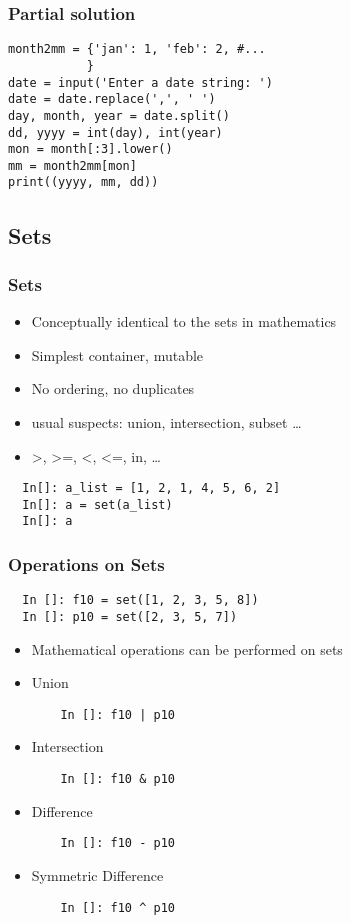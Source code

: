 \documentclass[14pt,compress]{beamer}
\begin{document}
\begin{frame}[fragile]
  \frametitle{Partial solution}
\begin{lstlisting}
month2mm = {'jan': 1, 'feb': 2, #...
           }
date = input('Enter a date string: ')
date = date.replace(',', ' ')
day, month, year = date.split()
dd, yyyy = int(day), int(year)
mon = month[:3].lower()
mm = month2mm[mon]
print((yyyy, mm, dd))
\end{lstlisting}
\end{frame}

\subsection{Sets}
\begin{frame}[fragile]
  \frametitle{Sets}
  \begin{itemize}
  \item Conceptually identical to the sets in mathematics
  \item Simplest container, mutable
  \item No ordering, no duplicates
  \item usual suspects: union, intersection, subset \ldots
  \item >, >=, <, <=, in, \ldots
  \end{itemize}
  \begin{lstlisting}
  In[]: a_list = [1, 2, 1, 4, 5, 6, 2]
  In[]: a = set(a_list)
  In[]: a
  \end{lstlisting}
\end{frame}

\begin{frame}
  \frametitle{Operations on Sets}
  \begin{lstlisting}
  In []: f10 = set([1, 2, 3, 5, 8])
  In []: p10 = set([2, 3, 5, 7])
  \end{lstlisting}
  \begin{itemize}
  \item Mathematical operations can be performed on sets
  \end{itemize}
  \begin{itemize}
  \item Union
    \begin{lstlisting}
    In []: f10 | p10
    \end{lstlisting}
  \item Intersection
    \begin{lstlisting}
    In []: f10 & p10
    \end{lstlisting}
  \item Difference
    \begin{lstlisting}
    In []: f10 - p10
    \end{lstlisting}
  \item Symmetric Difference
\begin{lstlisting}
    In []: f10 ^ p10
    \end{lstlisting}
  \end{itemize}
\end{frame}
\end{document}
